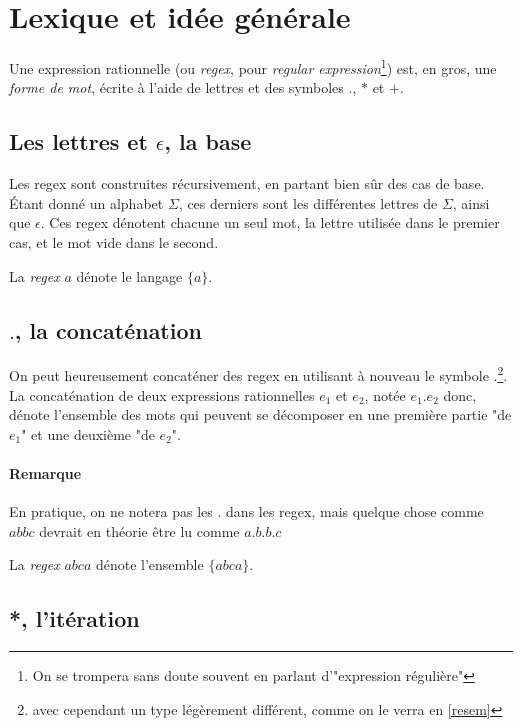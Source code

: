 \section{Lexique et idée générale}

Une expression rationnelle (ou \textit{regex}, pour \textit{regular expression}\footnote{On se trompera sans doute souvent en parlant d'"expression régulière"}) est, en gros, une \textit{forme de mot}, écrite à l'aide de lettres et des symboles $.$, $*$ et $+$.

\subsection{Les lettres et $\epsilon$, la base}

Les regex sont construites récursivement, en partant bien sûr des cas de base. Étant donné un alphabet $\Sigma$, ces derniers sont les différentes lettres de $\Sigma$, ainsi que $\epsilon$. Ces regex dénotent chacune un seul mot, la lettre utilisée dans le premier cas, et le mot vide dans le second.


\begin{example}
La \textit{regex} $a$ dénote le langage $\{a\}$.
\end{example}


\subsection{$.$, la concaténation}

On peut heureusement concaténer des regex en utilisant à nouveau le symbole $.$\footnote{avec cependant un type légèrement différent, comme on le verra en \ref{resem}}. La concaténation de deux expressions rationnelles $e_1$ et $e_2$, notée $e_1.e_2$ donc, dénote l'ensemble des mots qui peuvent se décomposer en une première partie "de $e_1$" et une deuxième "de $e_2$".

\paragraph{Remarque} En pratique, on ne notera pas les $.$ dans les regex, mais quelque chose comme $abbc$ devrait en théorie être lu comme $a.b.b.c$


\begin{example}
La \textit{regex} $abca$ dénote l'ensemble $\{abca\}$.
\end{example}


\subsection{*, l'itération}

